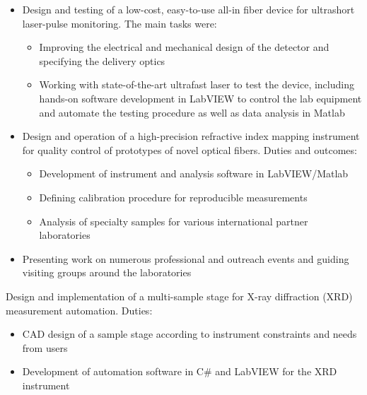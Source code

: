 \documentclass[11pt,a4paper,sans]{moderncv} %
\begin{document}
{\begin{itemize}
\item Design and testing of a low-cost, easy-to-use all-in fiber device for ultrashort laser-pulse monitoring. The main tasks were:
\begin{itemize}
\item Improving the electrical and mechanical design of the detector and specifying the delivery optics
\item Working with state-of-the-art ultrafast laser to test the device, including hands-on software development in LabVIEW to control the lab equipment and automate the testing procedure as well as data analysis in Matlab
\end{itemize}
\item Design and operation of a high-precision refractive index mapping instrument for quality control of prototypes of novel optical fibers. Duties and outcomes:
\begin{itemize}
\item Development of instrument and analysis software in LabVIEW/Matlab
\item Defining calibration procedure for reproducible measurements
\item Analysis of specialty samples for various international partner laboratories
\end{itemize}
\item Presenting work on numerous professional and outreach events and guiding visiting groups around the laboratories
\end{itemize}
}
{Design and implementation of a multi-sample stage for X-ray diffraction (XRD) measurement automation. 
Duties:
\begin{itemize}
\item CAD design of a sample stage according to instrument constraints and needs from users
\item Development of automation software in C\# and LabVIEW for the XRD instrument
\end{itemize}}

\end{document}
